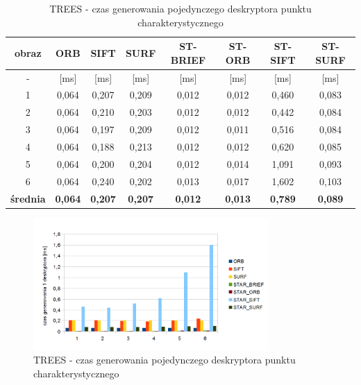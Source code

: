 \begin{table}[htbp]
  \centering
  \caption{TREES - czas generowania pojedynczego deskryptora punktu charakterystycznego}
    \begin{tabular}{|c|c|c|c|c|c|c|c|}\hline

    obraz & \textbf{ORB} & \textbf{SIFT} & \textbf{SURF} & \textbf{ST-BRIEF} & \textbf{ST-ORB} & \textbf{ST-SIFT} & \textbf{ST-SURF} \\\hline

    - & [ms] & [ms] & [ms] & [ms] & [ms] & [ms] & [ms] \\\hline
    1 & 0,064 & 0,207 & 0,209 & 0,012 & 0,012 & 0,460 & 0,083 \\
    2 & 0,064 & 0,210 & 0,203 & 0,012 & 0,012 & 0,442 & 0,084 \\
    3 & 0,064 & 0,197 & 0,209 & 0,012 & 0,011 & 0,516 & 0,084 \\
    4 & 0,064 & 0,188 & 0,213 & 0,012 & 0,012 & 0,620 & 0,085 \\
    5 & 0,064 & 0,200 & 0,204 & 0,012 & 0,014 & 1,091 & 0,093 \\
    6 & 0,064 & 0,240 & 0,202 & 0,013 & 0,017 & 1,602 & 0,103 \\\hline
    \textbf{średnia} & \textbf{0,064} & \textbf{0,207} & \textbf{0,207} & \textbf{0,012} & \textbf{0,013} & \textbf{0,789} & \textbf{0,089} \\\hline
    

    \end{tabular}%
  \label{tab:trees_f3}%
\end{table}%


\begin{figure}
\centering
\includegraphics[width=0.8\textwidth]{pict/mikolajczyk/trees/f3.png}
\caption{TREES - czas generowania pojedynczego deskryptora punktu charakterystycznego}
\label{fig:trees_f3}
\end{figure}


